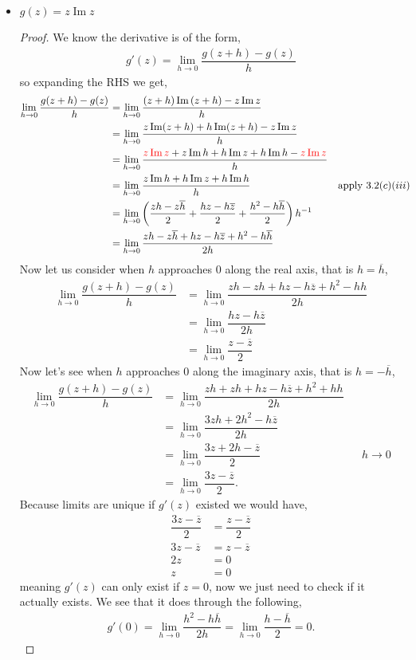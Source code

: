 \documentclass[11pt]{article}
\newenvironment{problem}[2][Problem\!]{\begin{trivlist}
\item[\hskip \labelsep {\bfseries #1}\hskip \labelsep {\bfseries #2}]}{\end{trivlist}}
\renewcommand{\Im}{\operatorname{Im}}
\newcommand{\tcr}[1]{\textcolor{red}{#1}}
\newcommand{\lrp}[1]{\left(#1\right)}
\begin{document}
\begin{problem}{3.5}
\begin{itemize}[itemsep=3em]
\item[(b)] $g(z) = z\Im z$
\begin{proof}
  We know the derivative is of the form,
  \begin{align*}
    g'(z) = \lim_{h \to 0} \dfrac{g(z + h ) - g(z)}{h}
  \end{align*}
  so expanding the RHS we get,
  \begin{align*}
    \lim_{h \to 0}\dfrac{g(z +h ) - g(z)}{h} &= \lim_{h \to 0}\dfrac{(z+h)\Im{(z+h)} - z\Im z}{h} \\
    &= \lim_{h \to 0}\dfrac{ z\Im(z+h) +h\Im(z+h) - z\Im z }{ h } \\
    &= \lim_{h \to 0}\dfrac{ \tcr{z\Im z} + z\Im h + h\Im z + h\Im h - \tcr{z\Im z}}{ h } \\
    &= \lim_{h \to 0}\dfrac{z\Im h + h\Im z + h\Im h }{h} && \text{apply }3.2(c)(iii) \\
    &= \lim_{h \to 0}\lrp{ \dfrac{ zh - z\overline{h} }{2} + \dfrac{ hz - h\overline{z} }{2} + \dfrac{h^{2} -h\overline{h}}{2} }h^{-1} \\
    &= \lim_{h \to 0}\dfrac{ zh - z\overline{h} +hz - h\overline{z} + h^{2} -h\overline{h} }{ 2h }
  \end{align*}
  Now let us consider when $h$ approaches 0 along the real axis, that is $h = \overline{h}$,
  \begin{align*}
    \lim_{h \to 0}\dfrac{g(z +h ) - g(z)}{h} &= \lim_{h \to 0}\dfrac{ zh - zh +hz - h\overline{z} + h^{2} -hh }{ 2h }\\
    &=  \lim_{h \to 0}\dfrac{ hz -h\overline{z}}{ 2h } \\
    &= \lim_{h \to 0}\dfrac{z - \overline{z}}{2} 
  \end{align*}
  Now let's see when $h$ approaches $0$ along the imaginary axis, that is $h = -\overline{h}$,
  \begin{align*}
    \lim_{h \to 0}\dfrac{g(z +h ) - g(z)}{h} &= \lim_{h \to 0}\dfrac{ zh + zh +hz - h\overline{z} + h^{2} +hh }{ 2h } \\
    &= \lim_{h \to 0}\dfrac{3zh + 2h^{2} -h\overline{z}}{2h} \\
    &= \lim_{h \to 0}\dfrac{3z + 2h -\overline{z}}{2} && h\to 0 \\
    &= \lim_{h \to 0}\dfrac{3z - \overline{z}}{2}.
  \end{align*}
  Because limits are unique if $g'(z)$ existed we would have,
  \begin{align*}
    \dfrac{3z - \overline{z}}{2} &= \dfrac{z - \overline{z}}{2} \\
    3z -\overline{z} &= z - \overline{z} \\
    2z &= 0 \\
    z &= 0
  \end{align*}
  meaning $g'(z)$ can only exist if $z = 0$, now we just need to check if it actually exists. We see that it does through the following,
  \begin{align*}
    g'(0) = \lim_{h\to 0}\dfrac{h^{2} -h\overline{h}}{2h} =\lim_{h\to 0} \dfrac{h -\overline{h}}{2} = 0.
  \end{align*}


\end{proof}
\end{itemize}
\end{problem}
\end{document}

